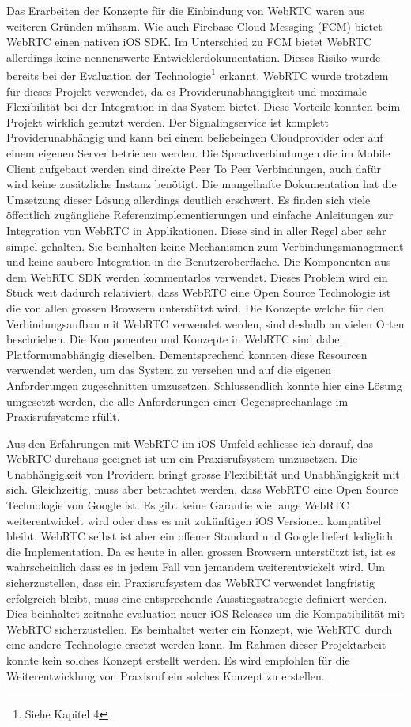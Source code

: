Das Erarbeiten der Konzepte für die Einbindung von WebRTC waren aus weiteren Gründen mühsam.
Wie auch Firebase Cloud Messging (FCM) bietet WebRTC einen nativen iOS SDK.
Im Unterschied zu FCM bietet WebRTC allerdings keine nennenswerte Entwicklerdokumentation.
Dieses Risiko wurde bereits bei der Evaluation der Technologie\footnote{Siehe Kapitel 4} erkannt.
WebRTC wurde trotzdem für dieses Projekt verwendet, da es Providerunabhängigkeit und maximale Flexibilität bei der Integration in das System bietet.
Diese Vorteile konnten beim Projekt wirklich genutzt werden.
Der Signalingservice ist komplett Providerunabhängig und kann bei einem beliebeingen Cloudprovider oder auf einem eigenen Server betrieben werden.
Die Sprachverbindungen die im Mobile Client aufgebaut werden sind direkte Peer To Peer Verbindungen, auch dafür wird keine zusätzliche Instanz benötigt.
Die mangelhafte Dokumentation hat die Umsetzung dieser Lösung allerdings deutlich erschwert.
Es finden sich viele öffentlich zugängliche Referenzimplementierungen und einfache Anleitungen zur Integration von WebRTC in Applikationen.
Diese sind in aller Regel aber sehr simpel gehalten.
Sie beinhalten keine Mechanismen zum Verbindungsmanagement und keine saubere Integration in die Benutzeroberfläche.
Die Komponenten aus dem WebRTC SDK werden kommentarlos verwendet.
Dieses Problem wird ein Stück weit dadurch relativiert, dass WebRTC eine Open Source Technologie ist die von allen grossen Browsern unterstützt wird.
Die Konzepte welche für den Verbindungsaufbau mit WebRTC verwendet werden, sind deshalb an vielen Orten beschrieben.
Die Komponenten und Konzepte in WebRTC sind dabei Platformunabhängig dieselben.
Dementsprechend konnten diese Resourcen verwendet werden, um das System zu versehen und auf die eigenen Anforderungen zugeschnitten umzusetzen.
Schlussendlich konnte hier eine Lösung umgesetzt werden, die alle Anforderungen einer Gegensprechanlage im Praxisrufsysteme rfüllt.

Aus den Erfahrungen mit WebRTC im iOS Umfeld schliesse ich darauf, das WebRTC durchaus geeignet ist um ein Praxisrufsystem umzusetzen.
Die Unabhängigkeit von Providern bringt grosse Flexibilität und Unabhängigkeit mit sich.
Gleichzeitig, muss aber betrachtet werden, dass WebRTC eine Open Source Technologie von Google ist.
Es gibt keine Garantie wie lange WebRTC weiterentwickelt wird oder dass es mit zukünftigen iOS Versionen kompatibel bleibt.
WebRTC selbst ist aber ein offener Standard und Google liefert lediglich die Implementation.
Da es heute in allen grossen Browsern unterstützt ist, ist es wahrscheinlich dass es in jedem Fall von jemandem weiterentwickelt wird.
Um sicherzustellen, dass ein Praxisrufsystem das WebRTC verwendet langfristig erfolgreich bleibt, muss eine entsprechende Ausstiegsstrategie definiert werden.
Dies beinhaltet zeitnahe evaluation neuer iOS Releases um die Kompatibilität mit WebRTC sicherzustellen.
Es beinhaltet weiter ein Konzept, wie WebRTC durch eine andere Technologie ersetzt werden kann.
Im Rahmen dieser Projektarbeit konnte kein solches Konzept erstellt werden.
Es wird empfohlen für die Weiterentwicklung von Praxisruf ein solches Konzept zu erstellen.


